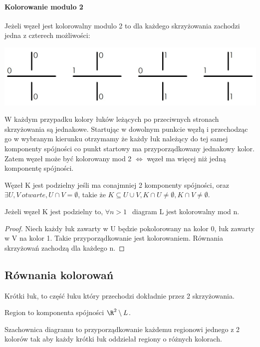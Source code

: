 \paragraph{Kolorowanie modulo 2} Jeżeli węzeł jest kolorowalny modulo 2 to dla każdego skrzyżowania zachodzi jedna z czterech możliwości:
	\begin{center}
			\includegraphics[scale=0.3]{2/Obrazy/Mod2}
	\end{center}
	W każdym przypadku kolory łuków leżących po przeciwnych stronach skrzyżowania są jednakowe. Startując w dowolnym punkcie węzłą i przechodząc go w wybranym kierunku otrzymamy że każdy łuk należący do tej samej komponenty spójności co punkt startowy ma przyporządkowany jednakowy kolor. Zatem węzeł może być kolorowany mod 2 $\Leftrightarrow$ węzeł ma więcej niż jedną komponentę spójności.
	
	\begin{definicja}
	Węzeł K jest podzielny jeśli ma conajmniej 2 komponenty spójności, oraz  $\exists U, V\:  otwarte, U \cap V = \emptyset$, takie że $ K\subseteq U\cup V, K\cap U \neq \emptyset, K\cap V \neq \emptyset$.
	\end{definicja}
	
	
\begin{lemat}
	Jeżeli węzeł K jest podzielny to, $\forall n >1 \:\:$ diagram L jest kolorowalny mod n.
\end{lemat}
	
\begin{proof}
Niech każdy łuk zawarty w U będzie pokolorowany na kolor 0, łuk zawarty w V na kolor 1. Takie przyporządkowanie jest kolorowaniem. Równania skrzyżowań zachodzą dla każdego n. 
\end{proof}

	
\subsection{Równania kolorowań}
\begin{definicja}
Krótki łuk, to część łuku który przechodzi dokładnie przez 2 skrzyżowania. 
\end{definicja}
\begin{definicja}
Region to komponenta spójności $\R^{2} \setminus L$.
\end{definicja}
\begin{definicja}
Szachownica diagramu to przyporządkowanie każdemu regionowi jednego z 2 kolorów tak aby każdy krótki łuk oddzielał regiony o różnych kolorach.
\end{definicja}

